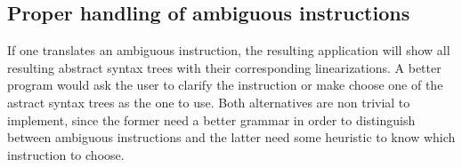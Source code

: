 \subsection{Proper handling of ambiguous instructions}
If one translates an ambiguous instruction, the resulting application will show all resulting abstract syntax trees with their corresponding linearizations. A better program would ask the user to clarify the instruction or make choose one of the astract syntax trees as the one to use. Both alternatives are non trivial to implement, since the former need a better grammar in order to distinguish between ambiguous instructions and the latter need some heuristic to know which instruction to choose.